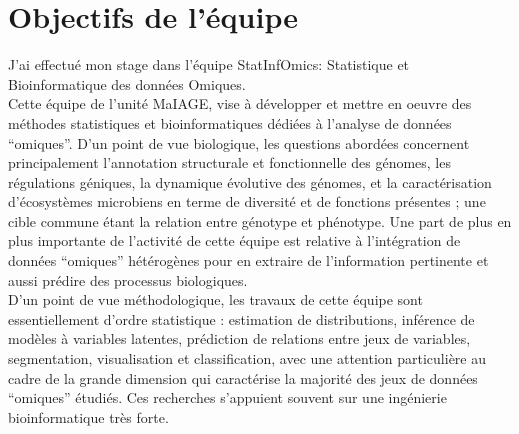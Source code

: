 \documentclass[11pt,a4paper]{article} %
\begin{document}
\section{Objectifs de l'équipe} 
J'ai effectué mon stage dans l'équipe StatInfOmics: Statistique et Bioinformatique des données Omiques.\\
Cette équipe de l'unité MaIAGE, vise à développer et mettre en oeuvre des méthodes statistiques et bioinformatiques dédiées à l’analyse de données “omiques”. D’un point de vue biologique, les questions abordées concernent principalement l’annotation structurale et fonctionnelle des génomes, les régulations géniques, la dynamique évolutive des génomes, et la caractérisation d’écosystèmes microbiens en terme de diversité et de fonctions présentes ; une cible commune étant la relation entre génotype et phénotype. Une part de plus en plus importante de l'activité de cette équipe est relative à l’intégration de données “omiques” hétérogènes pour en extraire de l’information pertinente et aussi prédire des processus biologiques.\\
D’un point de vue méthodologique, les travaux de cette équipe sont essentiellement d’ordre statistique : estimation de distributions, inférence de modèles à variables latentes, prédiction de relations entre jeux de variables, segmentation, visualisation et classification, avec une attention particulière au cadre de la grande dimension qui caractérise la majorité des jeux de données “omiques” étudiés. Ces recherches s’appuient souvent sur une ingénierie bioinformatique très forte.
\newpage
\end{document}
